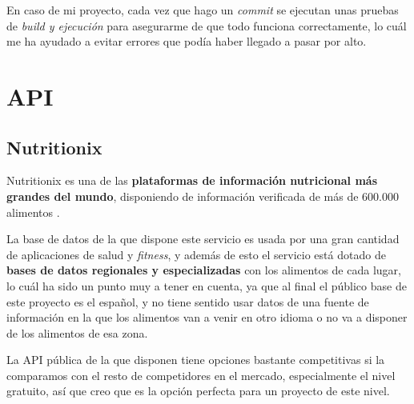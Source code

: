 En caso de mi proyecto, cada vez que hago un \textit{commit} se ejecutan unas pruebas de \textit{build y ejecución} para asegurarme de que todo funciona correctamente, lo cuál me ha ayudado a evitar errores que podía haber llegado a pasar por alto.


\section{API}

\subsection{Nutritionix}

Nutritionix es una de las \textbf{plataformas de información nutricional más grandes del mundo}, disponiendo de información verificada de más de 600.000 alimentos \cite{nutritionix:main}.

La base de datos de la que dispone este servicio es usada por una gran cantidad de aplicaciones de salud y \textit{fitness}, y además de esto el servicio está dotado de \textbf{bases de datos regionales y especializadas} con los alimentos de cada lugar, lo cuál ha sido un punto muy a tener en cuenta, ya que al final el público base de este proyecto es el español, y no tiene sentido usar datos de una fuente de información en la que los alimentos van a venir en otro idioma o no va a disponer de los alimentos de esa zona.

La API pública de la que disponen tiene opciones bastante competitivas si la comparamos con el resto de competidores en el mercado, especialmente el nivel gratuito, así que creo que es la opción perfecta para un proyecto de este nivel.